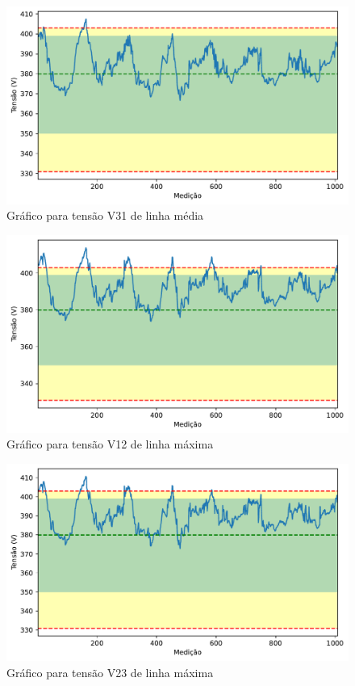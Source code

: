 \begin{figure}[H]
	\centering
	\caption{Gráfico para tensão V31 de linha média}
    \includegraphics[width=16cm]{illustrations/figures/a1_V31_Avg.pdf}
\end{figure}

\begin{figure}[H]
	\centering
	\caption{Gráfico para tensão V12 de linha máxima}
    \includegraphics[width=16cm]{illustrations/figures/a1_V12_Max.pdf}
\end{figure}

\begin{figure}[H]
	\centering
	\caption{Gráfico para tensão V23 de linha máxima}
    \includegraphics[width=16cm]{illustrations/figures/a1_V23_Max.pdf}
\end{figure}

